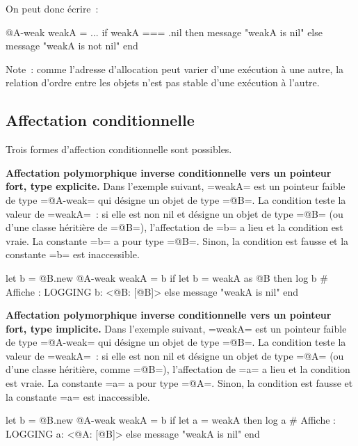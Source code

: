 On peut donc écrire~:
\begin{galgas4}
  @A-weak weakA = ...
  if weakA === .nil then
    message "weakA is nil\n"
  else
    message "weakA is not nil\n"
  end
\end{galgas4}


Note~: comme l'adresse d'allocation peut varier d'une exécution à une autre, la relation d'ordre entre les objets n'est pas stable d'une exécution à l'autre.




\subsection{Affectation conditionnelle}

Trois formes d'affection conditionnelle sont possibles.

{\bf Affectation polymorphique inverse conditionnelle vers un pointeur fort, type explicite.}  Dans l'exemple suivant, \ggsq=weakA= est un pointeur faible de type \ggsq=@A-weak= qui désigne un objet de type \ggsq=@B=. La condition teste la valeur de \ggsq=weakA=~: si elle est non nil et désigne un objet de type \ggsq=@B= (ou d'une classe héritière de \ggsq=@B=), l'affectation de \ggsq=b= a lieu et la condition est vraie. La constante \ggsq=b= a pour type \ggsq=@B=. Sinon, la condition est fausse et la constante \ggsq=b= est inaccessible.

\begin{galgas4}
  let b = @B.new
  @A-weak weakA = b
  if let b = weakA as @B then
    log b # Affiche : LOGGING b: <@B: [@B]>
  else
    message "weakA is nil\n"
  end
\end{galgas4}


{\bf Affectation polymorphique inverse conditionnelle vers un pointeur fort, type implicite.}  Dans l'exemple suivant, \ggsq=weakA= est un pointeur faible de type \ggsq=@A-weak= qui désigne un objet de type \ggsq=@B=. La condition teste la valeur de \ggsq=weakA=~: si elle est non nil et désigne un objet de type \ggsq=@A= (ou d'une classe héritière, comme \ggsq=@B=), l'affectation de \ggsq=a= a lieu et la condition est vraie. La constante \ggsq=a= a pour type \ggsq=@A=. Sinon, la condition est fausse et la constante \ggsq=a= est inaccessible.

\begin{galgas4}
  let b = @B.new
  @A-weak weakA = b
  if let a = weakA then
    log a # Affiche : LOGGING a: <@A: [@B]>
  else
    message "weakA is nil\n"
  end
\end{galgas4}


